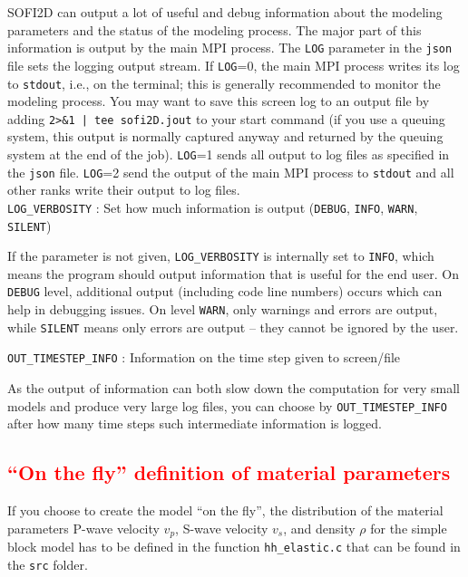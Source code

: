 SOFI2D can output a lot of useful and debug information about the modeling parameters and the status of the modeling process. The major part of this information is output by the main MPI process. The \texttt{LOG} parameter in the \texttt{json} file sets the logging output stream. If \texttt{LOG}=0, the main MPI process writes its log to \texttt{stdout}, i.e., on the terminal; this is generally recommended  to monitor the modeling process. You may want to save this screen log to an output file by adding \texttt{2>\&1 | tee sofi2D.jout} to your start command (if you use a queuing system, this output is normally captured anyway and returned by the queuing system at the end of the job). \texttt{LOG}=1 sends all output to log files as specified in the \texttt{json} file. \texttt{LOG}=2 send the output of the main MPI process to \texttt{stdout} and all other ranks write their output to log files.\\

\texttt{LOG\_VERBOSITY} : Set how much information is output (\texttt{DEBUG}, \texttt{INFO}, \texttt{WARN}, \texttt{SILENT})

If the parameter is not given, \texttt{LOG\_VERBOSITY} is internally set to \texttt{INFO}, which means the program should output information that is useful for the end user. On \texttt{DEBUG} level, additional output (including code line numbers) occurs which can help in debugging issues. On level \texttt{WARN}, only warnings and errors are output, while \texttt{SILENT} means only errors are output -- they cannot be ignored by the user.

\texttt{OUT\_TIMESTEP\_INFO} : Information on the time step given to screen/file

As the output of information can both slow down the computation for very small models and produce very large log files, you can choose by \texttt{OUT\_TIMESTEP\_INFO} after how many time steps such intermediate information is logged.

\textcolor{red}{\subsection{\enquote{On the fly} definition of material parameters}}
\label{model_def_func}
If you choose to create the model \enquote{on the fly}, the distribution of the material parameters P-wave velocity $v_p$, S-wave velocity $v_s$, and density $\rho$ for the simple block model has to be defined in the function \texttt{hh\_elastic.c} that can be found in the \texttt{src} folder.

